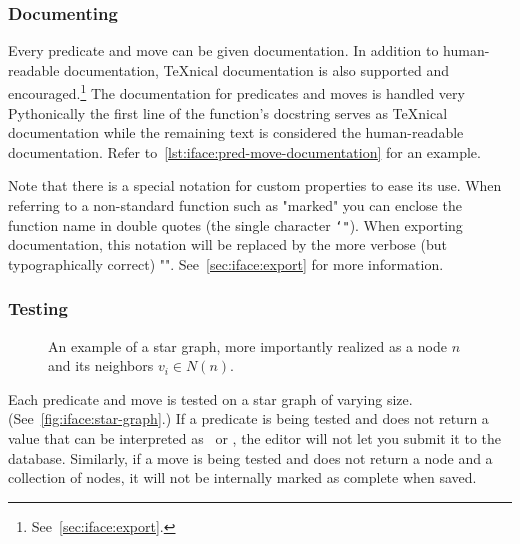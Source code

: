 \subsubsection{Documenting}
\label{iface:document:pred-move}
Every predicate and move can be given documentation.
In addition to human-readable documentation,
  \TeX nical documentation is also supported and encouraged.\footnote{%
    See~\autoref{sec:iface:export}.}
The documentation for predicates and moves is handled very Pythonically \Dash
  the first line of the function's docstring serves as \TeX nical documentation
  while the remaining text is considered the human-readable documentation.
Refer to~\autoref{lst:iface:pred-move-documentation} for an example.


Note that there is a special notation for custom properties to ease its use.
When referring to a non-standard function
  \Dash such as "marked" \Dash
  you can enclose the function name in double quotes (the single character \texttt{\char`"}).
When exporting documentation,
  this notation will be replaced by the more verbose
  (but typographically correct) "".
See~\autoref{sec:iface:export} for more information.

\subsubsection{Testing}

\begin{figure}
  \centering
  \caption{An example of a star graph, more importantly realized as a
    node $n$ and its neighbors $v_i \in N(n)$.
    }
  \label{fig:iface:star-graph}
\end{figure}
Each predicate and move is tested on a star graph of varying size.
(See~\autoref{fig:iface:star-graph}.)
If a predicate is being tested and does not return a value that
  can be interpreted as \BooleanTrueValue\ or \BooleanFalseValue,
  the editor will not let you submit it to the database.
Similarly, if a move is being tested and does not return a node and a collection of nodes,
  it will not be internally marked as complete when saved.

